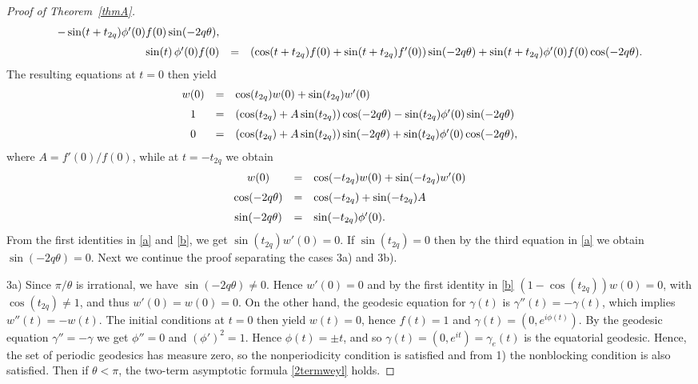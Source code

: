 \documentclass[11pt,a4paper,times]{amsart}
\theoremstyle{plain}
\theoremstyle{definition}
\numberwithin{equation}{section}
\newcommand{\eqskip}{ \vspace*{2mm}\\ }
\begin{document}
\begin{proof}[Proof of Theorem~\ref{thmA}]
\begin{equation}
\begin{array}{rcl}
-\sin(t+t_{2q})\phi'(0)f(0)\sin(-2q\theta), \eqskip
\sin(t)\, \phi'(0)f(0) & = & (\cos (t+t_{2q}) f(0)+
\sin (t+t_{2q}) f'(0))\sin(-2q\theta)+\sin(t+t_{2q})\phi'(0)f(0)\cos(-2q\theta).\nonumber
\end{array}
\end{equation}
The resulting equations at $t=0$ then yield
\begin{equation}\label{a}
\begin{array}{cll}
w(0) & = &\cos(t_{2q})w(0) + \sin(t_{2q})w'(0)\eqskip
 1 & = & \left(\cos(t_{2q})+A\sin(t_{2q})\right)\cos(-2q\theta)-\sin(t_{2q})\phi'(0)\sin(-2q\theta)\eqskip
 0 & = & \left(\cos(t_{2q}) +A\sin(t_{2q})\right)\sin(-2q\theta) +\sin(t_{2q})\phi'(0)\cos(-2q\theta),
\end{array}
\end{equation}
where $A=f'(0)/f(0)$, while at $t=-t_{2q}$ we obtain
\begin{equation}\label{b}
\begin{array}{cll}
 w(0) & = & \cos(-t_{2q})w(0)+\sin(-t_{2q})w'(0)\eqskip
 \cos(-2q\theta) & = & \cos(-t_{2q})+\sin( {-}t_{2q})A\eqskip
 \sin(-2q\theta) & = & \sin(-t_{2q})\phi'(0).
\end{array}
\end{equation}
From the first identities in \eqref{a} and \eqref{b}, we get $\sin(t_{2q})w'(0)=0$.
If $\sin(t_{2q})=0$ then by the third equation in \eqref{a} we obtain $\sin(-2q\theta)=0$.
Next we continue the proof separating the cases {\rm 3a)} and {\rm 3b)}.
\smallskip

3a) Since $\pi/\theta$ is irrational, we have $\sin(-2q\theta)\neq 0$. Hence $w'(0)=0$ and by the first identity in \eqref{b}
$(1-\cos(t_{2q}))w(0)=0$, with $\cos(t_{2q})\neq 1$, and thus $w'(0)=w(0)=0$.
On the other hand, the geodesic equation for $\gamma(t)$ is $\gamma''(t)=-\gamma(t)$, which implies $w''(t)=-w(t)$.
The initial conditions at $t=0$ then yield $w(t)=0$, hence $f(t)=1$ and $\gamma(t)=(0, e^{i\phi(t)})$.
By the geodesic equation $\gamma''=-\gamma$ we get $\phi''=0$ and $(\phi')^2=1$. Hence $\phi(t)=\pm t$, and so
$\gamma(t)=(0, e^{it})=\gamma_{e}(t)$ is the equatorial geodesic.
Hence, the set of periodic geodesics has measure zero, so the nonperiodicity condition is satisfied and from 1) the nonblocking condition is also satisfied.
Then if $\theta<\pi$, the two-term asymptotic formula \eqref{2termweyl} holds.
\smallskip


\end{proof}
\end{document}
